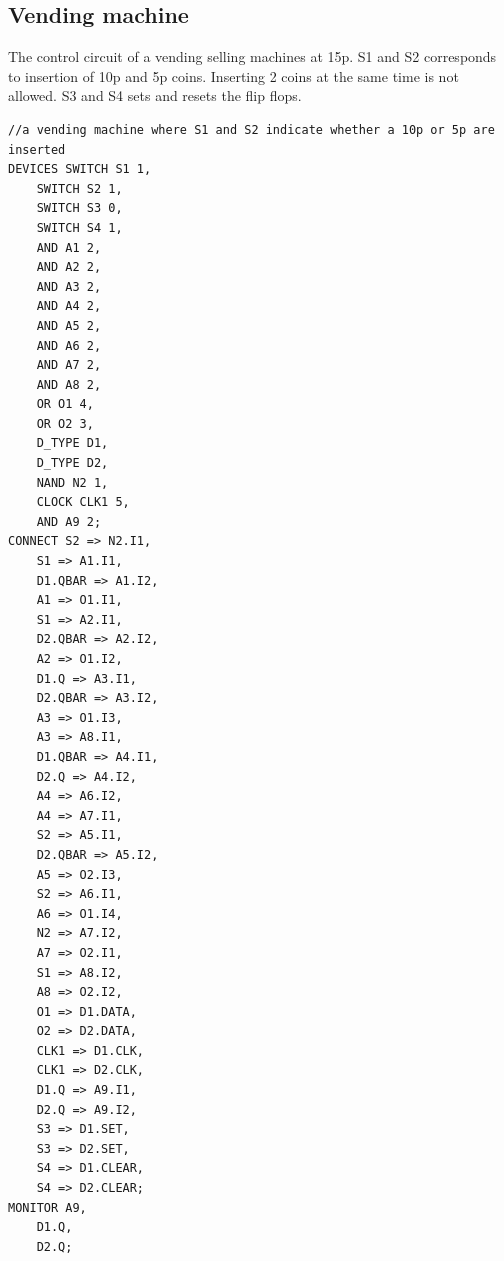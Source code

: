\documentclass[12pt]{article}
\begin{document}
\subsection{Vending machine}
The control circuit of a vending selling machines at 15p. S1 and S2 corresponds to insertion of 10p and 5p coins. Inserting 2 coins at the same time is not allowed. S3 and S4 sets and resets the flip flops.\\
\begin{verbatim}
//a vending machine where S1 and S2 indicate whether a 10p or 5p are inserted
DEVICES	SWITCH S1 1, 
	SWITCH S2 1,
	SWITCH S3 0,
	SWITCH S4 1,
	AND A1 2,
	AND A2 2,
	AND A3 2,
	AND A4 2,
	AND A5 2,
	AND A6 2,
	AND A7 2,
	AND A8 2,
	OR O1 4,
	OR O2 3,
	D_TYPE D1,
	D_TYPE D2,
	NAND N2 1,
	CLOCK CLK1 5,
	AND A9 2;
CONNECT	S2 => N2.I1,
	S1 => A1.I1,
	D1.QBAR => A1.I2,
	A1 => O1.I1,
	S1 => A2.I1,
	D2.QBAR => A2.I2,
	A2 => O1.I2,
	D1.Q => A3.I1,
	D2.QBAR => A3.I2,
	A3 => O1.I3,
	A3 => A8.I1,
	D1.QBAR => A4.I1,
	D2.Q => A4.I2,
	A4 => A6.I2,
	A4 => A7.I1,
	S2 => A5.I1,
	D2.QBAR => A5.I2,
	A5 => O2.I3,
	S2 => A6.I1,
	A6 => O1.I4,
	N2 => A7.I2,
	A7 => O2.I1,
	S1 => A8.I2,
	A8 => O2.I2,
	O1 => D1.DATA,
	O2 => D2.DATA,
	CLK1 => D1.CLK,
	CLK1 => D2.CLK,
	D1.Q => A9.I1,
	D2.Q => A9.I2,
	S3 => D1.SET,
	S3 => D2.SET,
	S4 => D1.CLEAR,
	S4 => D2.CLEAR;
MONITOR	A9,
	D1.Q,
	D2.Q;
\end{verbatim}
\end{document}

